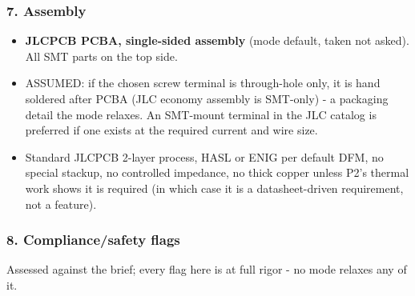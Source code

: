 \documentclass[11pt,a4paper]{article}
\begin{document}
\subsubsection*{7. Assembly}
\begin{itemize}
\item \textbf{JLCPCB PCBA, single-sided assembly} (mode default, taken not asked). All
SMT parts on the top side.
\item ASSUMED: if the chosen screw terminal is through-hole only, it is hand
soldered after PCBA (JLC economy assembly is SMT-only) - a packaging
detail the mode relaxes. An SMT-mount terminal in the JLC catalog is
preferred if one exists at the required current and wire size.
\item Standard JLCPCB 2-layer process, HASL or ENIG per default DFM, no special
stackup, no controlled impedance, no thick copper unless P2's thermal work
shows it is required (in which case it is a datasheet-driven requirement,
not a feature).
\end{itemize}
\subsubsection*{8. Compliance/safety flags}
Assessed against the brief; every flag here is at full rigor - no mode relaxes any of it.
\end{document}
